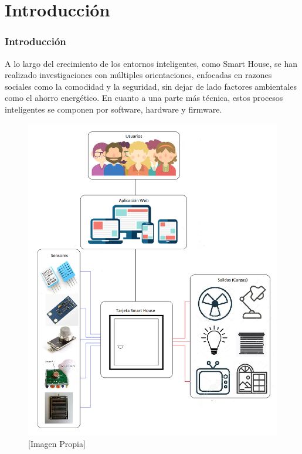 \section{Introducción}
\begin{frame}
\frametitle{Introducción}
\footnotesize
 A lo largo del crecimiento de los entornos inteligentes, como Smart House, se han realizado investigaciones con múltiples orientaciones, enfocadas en razones sociales como la comodidad y la seguridad, sin dejar de lado factores ambientales como el ahorro energético. En cuanto a una parte más técnica, estos procesos inteligentes se componen por software, hardware y firmware.\newline
 
 \begin{figure}[!]
 	\centering
 	\caption{ [Imagen Propia]}
 	\label{fig:intr}
 	\includegraphics[width=0.4\linewidth]{Imagenes/Diagramas}
 \end{figure}
\end{frame}